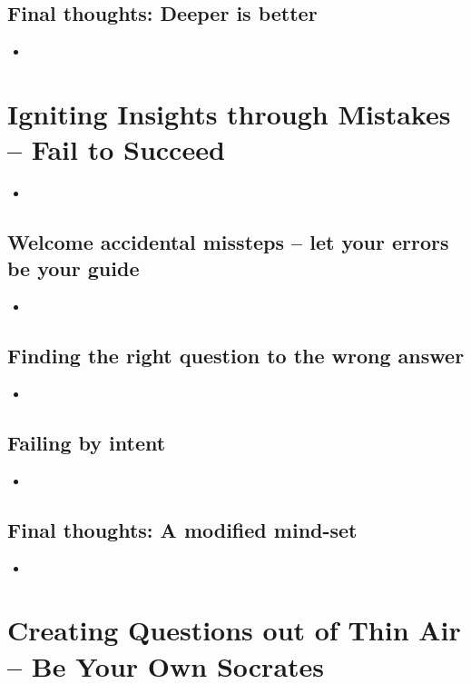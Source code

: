 \documentclass[11pt]{article}
\begin{document}
\subsection{Final thoughts: Deeper is better}
\begin{itemize}
\item
\end{itemize}

\section{Igniting Insights through Mistakes -- Fail to Succeed}
\begin{itemize}
\item
\end{itemize}

\subsection{Welcome accidental missteps -- let your errors be your guide}
\begin{itemize}
\item
\end{itemize}

\subsection{Finding the right question to the wrong answer}
\begin{itemize}
\item
\end{itemize}

\subsection{Failing by intent}
\begin{itemize}
\item
\end{itemize}

\subsection{Final thoughts: A modified mind-set}
\begin{itemize}
\item
\end{itemize}

\section{Creating Questions out of Thin Air -- Be Your Own Socrates}
\end{document}
